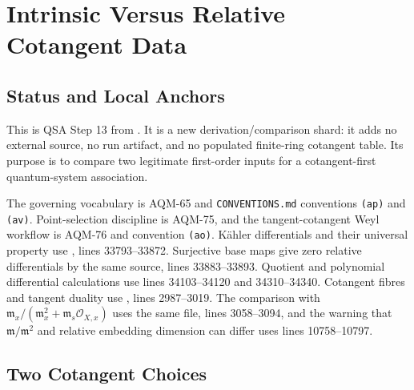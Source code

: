 
\section{Intrinsic Versus Relative Cotangent Data}
\label{sec:qsa-intrinsic-relative-cotangent}

\subsection{Status and Local Anchors}

This is QSA Step 13 from
.  It is a new
derivation/comparison shard: it adds no external source, no run artifact, and
no populated finite-ring cotangent table.  Its purpose is to compare two
legitimate first-order inputs for a cotangent-first quantum-system
association.

The governing vocabulary is AQM-65 and \texttt{CONVENTIONS.md} conventions
\texttt{(ap)} and \texttt{(av)}.  Point-selection discipline is AQM-75, and
the tangent-cotangent Weyl workflow is AQM-76 and convention
\texttt{(ao)}.  K\"ahler differentials and their universal property use
, lines
33793--33872.  Surjective base maps give zero relative differentials by the
same source, lines 33883--33893.  Quotient and polynomial differential
calculations use lines 34103--34120 and 34310--34340.  Cotangent fibres and
tangent duality use
, lines
2987--3019.  The comparison with
\(\mathfrak m_x/(\mathfrak m_x^2+\mathfrak m_s\mathcal O_{X,x})\)
uses the same file, lines 3058--3094, and the warning that
\(\mathfrak m/\mathfrak m^2\) and relative embedding dimension can differ
uses lines 10758--10797.

\subsection{Two Cotangent Choices}

